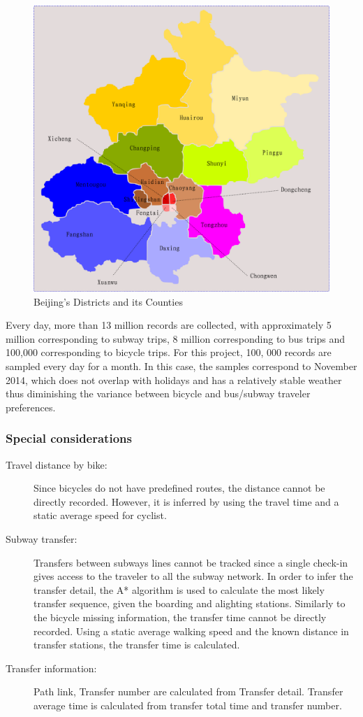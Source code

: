 \documentclass{article}
\begin{document}
\begin{figure}
  \centering
  \includegraphics[width=.8\linewidth]{./images/beijing_18areas.png}
  \caption{Beijing's Districts and its Counties}
  \label{fig:data/18areas}
\end{figure}

Every day, more than 13 million records are collected, with approximately 5 million corresponding to subway trips, 8 million corresponding to bus trips and 100,000 corresponding to bicycle trips. For this project, 100, 000 records are sampled every day for a month. In this case, the samples correspond to November 2014, which does not overlap with holidays and has a relatively stable weather thus diminishing the variance between bicycle and bus/subway traveler preferences.

\subsubsection{Special considerations}
\begin{description}%
\item[Travel distance by bike:] Since bicycles do not have predefined routes, the distance cannot be directly recorded. However, it is inferred by using the travel time and a static average speed for cyclist. 

\item[Subway transfer:] Transfers between subways lines cannot be tracked since a single check-in gives access to the traveler to all the subway network. In order to infer the transfer detail, the A* algorithm is used to calculate the most likely transfer sequence, given the boarding and alighting stations. 
Similarly to the bicycle missing information, the transfer time cannot be directly recorded. Using a static average walking speed and the known distance in transfer stations, the transfer time is calculated. 

\item[Transfer information:] Path link, Transfer number are calculated from Transfer detail. Transfer average time is calculated from transfer total time and transfer number. 

\end{description}
\end{document}

